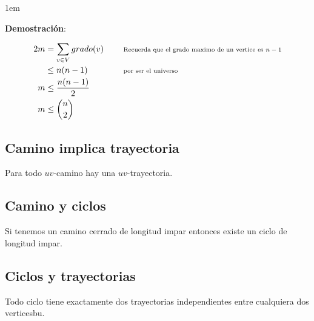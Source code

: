 \documentclass[12pt, fleqn]{report}                             %
\newenvironment{SmallIndentation}[1][0.75em]                    %
        {\begin{adjustwidth}{#1}{}\begin{footnotesize}}             %
        {\end{footnotesize}\end{adjustwidth}}                       %
\DeclareMathOperator \Space     {\quad}                         %
\newcommand \Remember[1]    {\Space\text{\scriptsize{#1}}}      %
\theoremstyle{break}                                            %
\begin{document}
                \begin{SmallIndentation}[1em]
                    \textbf{Demostración}:

                    
                    \begin{align*}
                        2m
                            &= \sum_{v \in V}{grado(v)}
                                && \Remember{Recuerda que el grado maximo de un vertice es $n -1$}    \\
                            &\leq n (n - 1)
                                && \Remember{por ser el universo}    \\
                            m &\leq \frac{n (n - 1)}{2} \\
                            m &\leq {n \choose 2}
                        \end{align*}


                \end{SmallIndentation}

            \subsection{Camino implica trayectoria}

                Para todo $uv$-camino hay una $uv$-trayectoria.

            \subsection{Camino y ciclos}

                Si tenemos un camino cerrado de longitud impar 
                entonces existe un ciclo de longitud impar.

            \subsection{Ciclos y trayectorias}

                Todo ciclo tiene exactamente dos trayectorias independientes entre cualquiera
                dos verticesbu.
\end{document}
